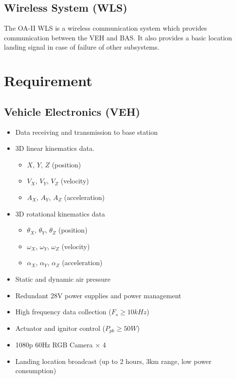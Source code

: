 \documentclass[12pt,article]{memoir}
\begin{document}
\subsection{Wireless System (WLS)}
The OA-II WLS is a wireless communication system which provides communication between the VEH and BAS. It also provides a basic location landing signal in case of failure of other subsystems.
\section{Requirement}
\subsection{Vehicle Electronics (VEH)}
\begin{itemize}
\item Data receiving and transmission to base station
\item 3D linear kinematics data.
\begin{itemize}
	\item $X$, $Y$, $Z$ (position)
	\item $V_X$, $V_Y$, $V_Z$ (velocity)
	\item $A_X$, $A_Y$, $A_Z$ (acceleration)
\end{itemize}
\item 3D rotational kinematics data
\begin{itemize}
	\item $\theta_X$, $\theta_Y$, $\theta_Z$ (position)
	\item $\omega_X$, $\omega_Y$, $\omega_Z$ (velocity)
	\item $\alpha_X$, $\alpha_Y$, $\alpha_Z$ (acceleration)
\end{itemize}
\item Static and dynamic air pressure
\item Redundant 28V power supplies and power management
\item High frequency data collection ($F_s \geq 10kHz$)
\item Actuator and ignitor control ($P_{pk} \geq 50W$)
\item 1080p 60Hz RGB Camera $\times$ 4
\item Landing location broadcast (up to 2 hours, 3km range, low power consumption)
\end{itemize}
\end{document}
